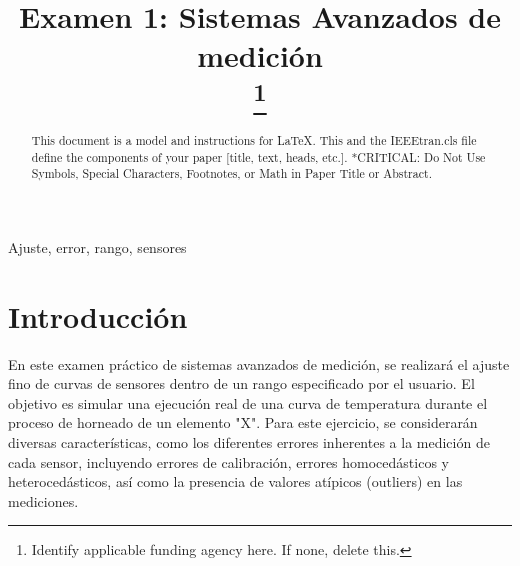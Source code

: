 \documentclass[conference]{IEEEtran}
\begin{document}
\title{Examen 1: Sistemas Avanzados de medici\'on\\
\thanks{Identify applicable funding agency here. If none, delete this.}
}

\author{
\and
{}

}

\maketitle

\begin{abstract}
This document is a model and instructions for \LaTeX.
This and the IEEEtran.cls file define the components of your paper [title, text, heads, etc.]. *CRITICAL: Do Not Use Symbols, Special Characters, Footnotes, 
or Math in Paper Title or Abstract.
\end{abstract}

\begin{IEEEkeywords}
Ajuste, error, rango, sensores
\end{IEEEkeywords}

\section{Introducción}

En este examen práctico de sistemas avanzados de medición, se realizará el ajuste fino de curvas de sensores dentro de un rango especificado por el usuario. El objetivo es simular una ejecución real de una curva de temperatura durante el proceso de horneado de un elemento "X". Para este ejercicio, se considerarán diversas características, como los diferentes errores inherentes a la medición de cada sensor, incluyendo errores de calibración, errores homocedásticos y heterocedásticos, así como la presencia de valores atípicos (outliers) en las mediciones.
\end{document}
